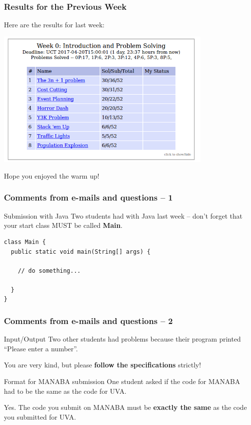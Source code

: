 \begin{frame}
  \frametitle{Results for the Previous Week}

  \begin{center}
    Here are the results for last week:

    \bigskip
    
    \includegraphics[width=0.8\textwidth]{img/resultW0}
    
    \bigskip

    Hope you enjoyed the warm up!
  \end{center}

\end{frame}

\begin{frame}[fragile]
  \frametitle{Comments from e-mails and questions -- 1}

  \begin{block}{Submission with Java}
    Two students had  with Java last week
    -- don't forget that your start class MUST be called {\bf Main}.
  \end{block}

  \vfill

\begin{verbatim}
class Main {
  public static void main(String[] args) {

    // do something...

  }
}
\end{verbatim}
\end{frame}

\begin{frame}
  \frametitle{Comments from e-mails and questions -- 2}
  \begin{block}{Input/Output}
    Two other students had problems because their program printed ``Please enter a number''.

    \bigskip

    You are very kind, but please {\bf follow the specifications} strictly!
  \end{block}
  
  \vfill

  \begin{block}{Format for MANABA submission}
    One student asked if the code for MANABA had to be the same as the code for UVA.

    \bigskip

    Yes. The code you submit on MANABA must be {\bf exactly the same}
    as the code you submitted for UVA.
  \end{block}
\end{frame}

